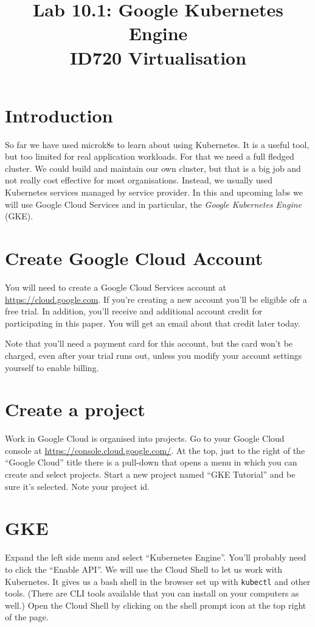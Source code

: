 \documentclass{article}
\begin{document}
\title{Lab 10.1: Google Kubernetes Engine\\ID720 Virtualisation}
\date{}
\maketitle

\section*{Introduction}
So far we have used microk8s to learn about using Kubernetes. It is a useful tool, but too limited for real application workloads. For that we need a full fledged cluster. We could build and maintain our own cluster, but that is a big job and not really cost effective for most organisations. Instead, we usually used Kubernetes services managed by service provider. In this and upcoming labs we will use Google Cloud Services and in particular, the \emph{Google Kubernetes Engine} (GKE).

\section{Create Google Cloud Account}
You will need to create a Google Cloud Services account at \url{https://cloud.google.com}. If you're creating a new account you'll be eligible ofr a free trial. In addition, you'll receive and additional account credit for participating in this paper. You will get an email about that credit later today.

Note that you'll need a payment card for this account, but the card won't be charged, even after your trial runs out, unless you modify your account settings yourself to enable billing.


\section{Create a project}
Work in Google Cloud is organised into projects. Go to your Google Cloud console at \url{https://console.cloud.google.com/}. At the top, just to the right of the ``Google Cloud'' title there is a pull-down that opens a menu in which you can create and select projects. Start a new project named ``GKE Tutorial'' and be sure it's selected. Note your project id.

\section{GKE}
Expand the left side menu and select ``Kubernetes Engine''. You'll probably need to click the ``Enable API''. We will use the Cloud Shell to let us work with Kubernetes. It gives us a bash shell in the browser set up with \texttt{kubectl} and other tools. (There are CLI tools available that you can install on your computers as well.) Open the Cloud Shell by clicking on the shell prompt icon at the top right of the page.
\end{document}
